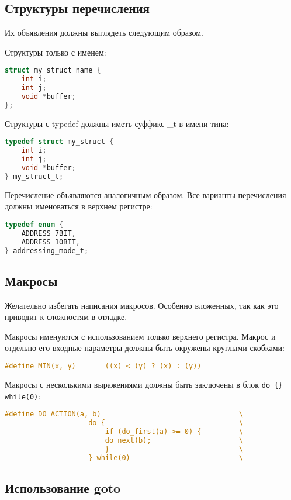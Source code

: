 \subsection*{Структуры перечисления}

Их объявления должны выглядеть следующим образом.

Структуры только с именем:
\begin{lstlisting}[language=C]
struct my_struct_name {
    int i;
    int j;
    void *buffer;
};
\end{lstlisting}

Структуры с typedef должны иметь суффикс \_t в имени типа:
\begin{lstlisting}[language=C]
typedef struct my_struct {
    int i;
    int j;
    void *buffer;
} my_struct_t;
\end{lstlisting}

Перечисление объявляются аналогичным образом. Все варианты перечисления должны именоваться в верхнем регистре:
\begin{lstlisting}[language=C]
typedef enum {
    ADDRESS_7BIT,
    ADDRESS_10BIT,
} addressing_mode_t;
\end{lstlisting}

\subsection*{Макросы}
Желательно избегать написания макросов. Особенно вложенных, так как это приводит к сложностям в отладке.

\linespace

Макросы именуются с использованием только верхнего регистра. Макрос и отдельно его входные параметры должны быть окружены круглыми скобками:
\begin{lstlisting}[language=C]
#define MIN(x, y)       ((x) < (y) ? (x) : (y))
\end{lstlisting}

Макросы с несколькими выражениями должны быть заключены в блок \verb|do {} while(0)|:
\begin{lstlisting}[language=C]
#define DO_ACTION(a, b)                                 \
                    do {                                \
                        if (do_first(a) >= 0) {         \
                        do_next(b);                     \
                        }                               \
                    } while(0)                          \
\end{lstlisting}

\subsection*{Использование goto}

